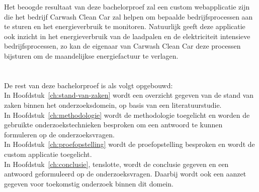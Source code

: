 Het beoogde resultaat van deze bachelorproef zal een custom webapplicatie zijn die het bedrijf Carwash Clean Car zal helpen om bepaalde bedrijfsprocessen aan te sturen en het energieverbruik te monitoren. Natuurlijk geeft deze applicatie ook inzicht in het energieverbruik van de laadpalen en de elektriciteit intensieve bedrijfsprocessen, zo kan de eigenaar van Carwash Clean Car deze processen bijsturen om de maandelijkse energiefactuur te verlagen.

\section{}%
\label{sec:opzet-bachelorproef}


De rest van deze bachelorproef is als volgt opgebouwd:\\

In Hoofdstuk~\ref{ch:stand-van-zaken} wordt een overzicht gegeven van de stand van zaken binnen het onderzoeksdomein, op basis van een literatuurstudie.\\

In Hoofdstuk~\ref{ch:methodologie} wordt de methodologie toegelicht en worden de gebruikte onderzoekstechnieken besproken om een antwoord te kunnen formuleren op de onderzoeksvragen.\\

In Hoofdstuk~\ref{ch:proefopstelling} wordt de proefopstelling besproken en wordt de custom applicatie toegelicht.\\

In Hoofdstuk~\ref{ch:conclusie}, tenslotte, wordt de conclusie gegeven en een antwoord geformuleerd op de onderzoeksvragen. Daarbij wordt ook een aanzet gegeven voor toekomstig onderzoek binnen dit domein.